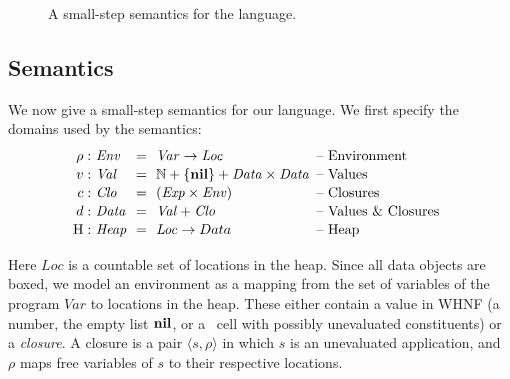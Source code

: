 \documentclass[9pt]{sigplanconf}
\begin{document}
\begin{figure*}[t!]
\begin{center}
\caption{A small-step semantics for the language. \label{fig:lang-semantics}}
\end{center}
\end{figure*}



\subsection{Semantics}
We now give  a small-step semantics for our  language.
We first specify the domains used by the semantics:
\[
\renewcommand{\arraystretch}{1.1}
\begin{array}{@{}r@{\ }l@{\ \ }c@{\ \ }l@{\hspace{0.5em}}l}
\rho: & \mathit{Env} &=&\mathit{Var} \rightarrow \mathit{Loc} & \mbox{-- Environment} \\
v:   & \mathit{Val} &=& \mathbb{N} + \{\NIL\} + \mathit{Data \times Data}& \mbox{-- Values}\\
c:   & \mathit{Clo} &=& \mathit{(Exp \times Env)}& \mbox{-- Closures}\\
d: & \mathit{Data} &=&\mathit{Val} + \mathit{Clo} & \mbox{-- Values \& Closures} \\
\heap: & \mathit{Heap} & =&\mathit{Loc} \rightarrow Data & \mbox{-- Heap}
\end{array}
\]

Here  $\mathit{Loc}$ is  a countable  set  of locations  in the  heap.
Since all data objects are boxed, we model an environment as a mapping
from the set  of variables of the program  $\mathit{Var}$ to locations
in the  heap.  These  either contain  a value in  WHNF (a  number, the
empty  list  $\mbox{$\mathbf{ nil}$}$,  or  a  \CONS\  cell  with  possibly  unevaluated
constituents) or  a {\em closure}.   A closure  is a pair  $\langle s,
\rho\rangle$ in  which $s$ is  an unevaluated application,  and $\rho$
maps free variables of $s$ to their respective locations.
\end{document}
